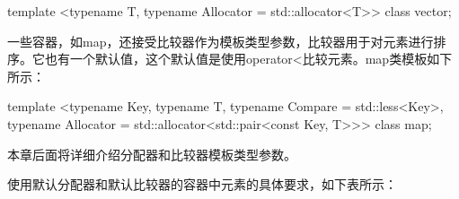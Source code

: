 \begin{cpp}
template <typename T, typename Allocator = std::allocator<T>> class vector;
\end{cpp}

一些容器，如map，还接受比较器作为模板类型参数，比较器用于对元素进行排序。它也有一个默认值，这个默认值是使用operator<比较元素。map类模板如下所示：

\begin{cpp}
template <typename Key, typename T, typename Compare = std::less<Key>,
    typename Allocator = std::allocator<std::pair<const Key, T>>> class map;
\end{cpp}

本章后面将详细介绍分配器和比较器模板类型参数。

使用默认分配器和默认比较器的容器中元素的具体要求，如下表所示：

